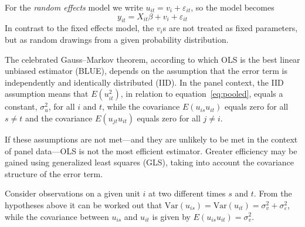 For the \textsl{random effects} model we write $u_{it} = v_i +
\varepsilon_{it}$, so the model becomes
\begin{equation}
\label{eq:RE}
y_{it} = X_{it}\beta + v_i + \varepsilon_{it}
\end{equation}
In contrast to the fixed effects model, the $v_i$s are not treated as
fixed parameters, but as random drawings from a given probability
distribution.

The celebrated Gauss--Markov theorem, according to which OLS is the
best linear unbiased estimator (BLUE), depends on the assumption that
the error term is independently and identically distributed (IID).  In
the panel context, the IID assumption means that $E(u_{it}^2)$, in
relation to equation~\ref{eq:pooled}, equals a constant, $\sigma^2_u$,
for all $i$ and $t$, while the covariance $E(u_{is} u_{it})$ equals
zero for all $s \neq t$ and the covariance $E(u_{jt} u_{it})$ equals
zero for all $j \neq i$.

If these assumptions are not met---and they are unlikely to be met
in the context of panel data---OLS is not the most efficient
estimator.  Greater efficiency may be gained using generalized least
squares (GLS), taking into account the covariance structure of the
error term.  

Consider observations on a given unit $i$ at two different times
$s$ and $t$. From the hypotheses above it can be worked out that
$\mbox{Var}(u_{is}) = \mbox{Var}(u_{it}) = \sigma^2_{v} +
\sigma^2_{\varepsilon}$, while the covariance between $u_{is}$ and
$u_{it}$ is given by $E(u_{is}u_{it}) = \sigma^2_{v}$.

